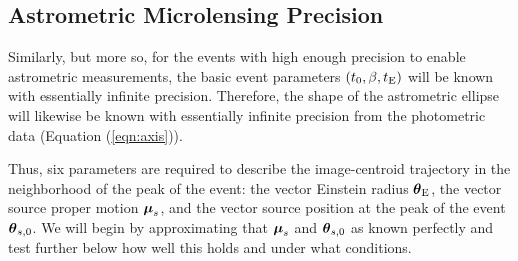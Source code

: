 \documentclass[12pt,preprint]{aastex}
\newcommand{\bdv}[1]{\mbox{\boldmath$#1$}}
\def\e{{\rm E}}
\def\bmu{{\bdv\mu}}
\def\btheta{{\bdv\theta}}
\begin{document}
\subsection{{Astrometric Microlensing Precision}
\label{sec:astroprecise}}

Similarly, but more so, for the events with high enough precision
to enable astrometric measurements, the basic event parameters 
$(t_0,\beta,t_\e)$ will be known with essentially infinite precision.
Therefore, the shape of the astrometric ellipse will likewise be known
with essentially infinite precision from the photometric data
(Equation (\ref{eqn:axis})).

Thus, six parameters are required to describe the image-centroid trajectory
in the neighborhood of the peak of the event:  the vector Einstein
radius $\btheta_\e$, the vector source proper motion $\bmu_s$,
and the vector source position at the peak of the event $\btheta_{s,0}$.
We will begin by approximating that $\bmu_s$ and  $\btheta_{s,0}$ as known
perfectly and test further below how well this holds
and under what conditions.
\end{document}
